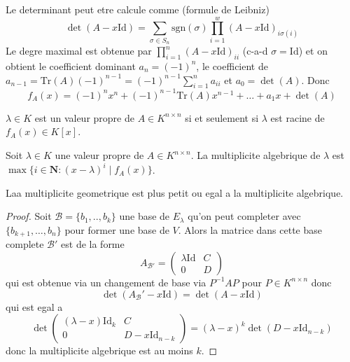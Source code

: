 Le determinant peut etre calcule comme (formule de Leibniz)
$$
\det(A-x\mathrm{Id})=\sum _{\sigma \in S_{n}}\mathrm{sgn}(\sigma)\prod_{i=1}^{w} (A-x\mathrm{Id})_{i\sigma(i)}
$$
Le degre maximal est obtenue par $\prod_{i=1}^{n}(A-x\mathrm{Id})_{ii}$ (c-a-d $\sigma=\mathrm{Id}$) et on obtient le coefficient dominant $a_{n}=(-1)^{n}$, le coefficient de $a_{n-1}=\mathrm{Tr}(A)(-1)^{n-1}=(-1)^{n-1}\sum_{i=1}^{n}a_{ii}$ et $a_{0}=\det(A)$. Donc
$$
f_{A}(x)=(-1)^{n}x^{n}+(-1)^{n-1}\mathrm{Tr}(A)x^{n-1}+\dots+a_{1}x+\det(A)
$$
\begin{remark}
$\lambda \in K$ est un valeur propre de $A\in K^{n\times n}$ si et seulement si $\lambda$ est racine de $f_{A}(x)\in K[x]$.
\end{remark}
\begin{definition}
Soit $\lambda \in K$ une valeur propre de $A\in K^{n\times n}$. La multiplicite algebrique de $\lambda$ est $\max\{ i\in \mathbf{N}:(x-\lambda)^{i}\mid f_{A}(x) \}$.
\end{definition}
\begin{theorem}
Laa multiplicite geometrique est plus petit ou egal a la multiplicite algebrique.
\end{theorem}
\begin{proof}
Soit $\mathscr{B}=\{ b_{1},..,b_{k} \}$ une base de $E_{\lambda}$ qu'on peut completer avec $\{ b_{k+1},\dots,b_{n} \}$ pour former une base de $V$. Alors la matrice dans cette base complete $\mathscr{B}'$ est de la forme
$$
A_{\mathscr{B}'}=\begin{pmatrix}
\lambda \mathrm{Id} & C \\
 0 & D
\end{pmatrix}
$$
qui est obtenue via un changement de base via $P^{-1}AP$ pour $P\in K^{n\times n}$ donc
$$
\det (A_{\mathscr{B}}'-x\mathrm{Id})=\det(A-x\mathrm{Id})
$$
qui est egal a
$$
\det \begin{pmatrix}
(\lambda-x)\mathrm{Id}_{k} & C \\
0 & D-x\mathrm{Id}_{n-k}
\end{pmatrix}=(\lambda-x)^{k}\det(D-x\mathrm{Id}_{n-k})
$$
donc la multiplicite algebrique est au moins $k$.
\end{proof}

